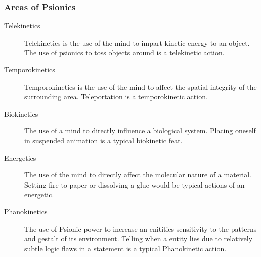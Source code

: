 \subsubsection{Areas of Psionics}

\begin{description}
	\item[Telekinetics]
	Telekinetics is the use of the mind to impart kinetic energy to an
	object. The use of psionics to toss objects around is a telekinetic 
	action.
	\item[Temporokinetics]
	Temporokinetics is the use of the mind to affect the spatial integrity
	of the surrounding area. Teleportation is a temporokinetic action.
	\item[Biokinetics]
	The use of a mind to directly influence a biological system. Placing 
	oneself in suspended animation is a typical biokinetic feat.
	\item[Energetics]
	The use of the mind to directly affect the molecular nature of a
	material. Setting fire to paper or dissolving a glue would be 
	typical actions of an energetic.
	\item[Phanokinetics]
	The use of Psionic power to increase an enitities sensitivity to the 
	patterns and gestalt of its environment. Telling when a entity lies 
	due to relatively subtle logic flaws in a statement is a typical 
	Phanokinetic action.
\end{description}



